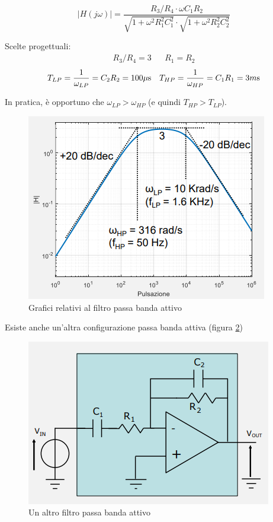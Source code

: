 \documentclass{article}
\begin{document}
\[|H(j \omega)| = \frac{R_3 / R_4 \cdot \omega C_1 R_2}{\sqrt{1 + \omega ^2 R^2_1 C^2_1} \cdot \sqrt{1 + \omega ^2 R^2_2 C^2_2}}\]

Scelte progettuali:
\begin{align*}
  R_3 / R_4 = 3 && R_1 = R_2 
\end{align*}
\begin{align*}
  T_{LP} = \frac{1}{\omega _{LP}} = C_2 R_2 = 100 \mu \textrm s && T_{HP} = \frac{1}{\omega _{HP}} = C_1 R_1 = 3 m \textrm s
\end{align*}

In pratica, è opportuno che $\omega _{LP} > \omega _{HP}$ (e quindi $T_{HP} > T_{LP}$).

\begin{figure}[h]
  \centering
  \includegraphics[scale=0.7]{IM_filtro_passa_banda_attivo_grafici}
  \caption{Grafici relativi al filtro passa banda attivo}
  \label{Schema_filtro_passa_banda_attivo_grafici}
\end{figure}
\clearpage
Esiste anche un'altra configurazione passa banda attiva (figura \ref{Schema_filtro_passa_banda_attivo_bis})

\begin{figure}[h]
  \centering
  \includegraphics[scale=0.7]{IM_filtro_passa_banda_attivo_bis}
  \caption{Un altro filtro passa banda attivo}
  \label{Schema_filtro_passa_banda_attivo_bis}
\end{figure}
\end{document}
